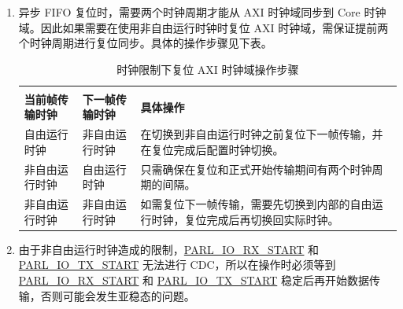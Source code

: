 \documentclass[main\_\_CN.tex]{subfiles}
\begin{document}
\begin{enumerate}
    \item 异步 FIFO 复位时，需要两个时钟周期才能从 AXI 时钟域同步到 Core 时钟域。因此如果需要在使用非自由运行时钟时复位 AXI 时钟域，需保证提前两个时钟周期进行复位同步。具体的操作步骤见下表。

\begin{table}[H]
    \centering
    \caption{时钟限制下复位 AXI 时钟域操作步骤}
    \label{tab:parlio-reset-clk-restriction}

    \begin{tabular}{|l|l|p{10cm}|}
    \hline
        \rowcolor{lightgray}
        \multicolumn{2}{|c|}{\textbf{时钟限制}} & \\
        \rowcolor{lightgray}
        \textbf{当前帧传输时钟} &\textbf{下一帧传输时钟} & \multirow{-2}{*}{\textbf{具体操作}}\\ \hline

        自由运行时钟    & 非自由运行时钟  & 在切换到非自由运行时钟之前复位下一帧传输，并在复位完成后配置时钟切换。    \\ \hline
        非自由运行时钟  & 自由运行时钟    & 只需确保在复位和正式开始传输期间有两个时钟周期的间隔。     \\ \hline
        非自由运行时钟  & 非自由运行时钟  & 如需复位下一帧传输，需要先切换到内部的自由运行时钟，复位完成后再切换回实际时钟。     \\ \hline
    \end{tabular}
\end{table}

    \item 由于非自由运行时钟造成的限制，\hyperref[fielddesc:PARLIORXSTART]{PARL\_IO\_RX\_START} 和 \hyperref[fielddesc:PARLIOTXSTART]{PARL\_IO\_TX\_START} 无法进行 CDC，所以在操作时必须等到 \hyperref[fielddesc:PARLIORXSTART]{PARL\_IO\_RX\_START} 和 \hyperref[fielddesc:PARLIOTXSTART]{PARL\_IO\_TX\_START} 稳定后再开始数据传输，否则可能会发生亚稳态的问题。


\end{enumerate}
\end{document}
